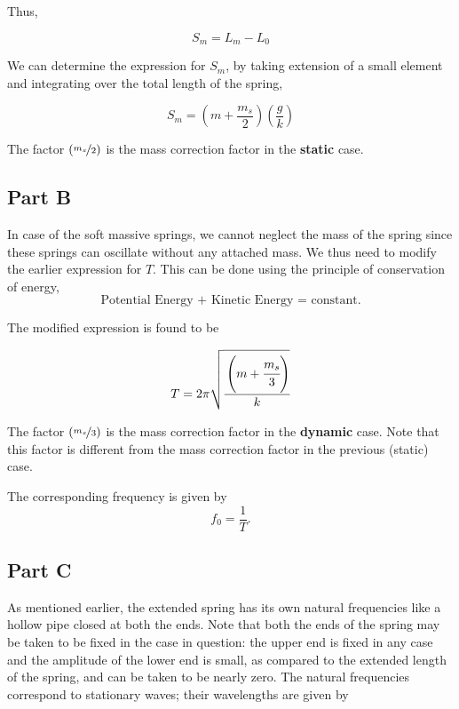 Thus,

\begin{equation}
S_m = L_m - L_0
\end{equation}

We can determine the expression for $S_m$, by taking extension of a small element and integrating over the total length of the spring,

\begin{equation}
S_m = \left( m + \frac{m_s}{2} \right)\left(\frac{g}{k} \right)
\end{equation}

The factor $(\nicefrac{m_s}{2})$ is the mass correction factor in the \textbf{static} case.


\subsection*{Part B}
In case of the soft massive springs, we cannot neglect the mass of the spring since these springs can oscillate without any attached mass. We thus need to modify the earlier expression for $T$. This can be done using the principle of conservation of energy, $$\text{Potential Energy + Kinetic Energy = constant.}$$

The modified expression is found to be

\begin{equation}
T = 2\pi \sqrt{\cfrac{\left(m + \cfrac{m_s}{3}\right)}{k}}
\end{equation}

The factor $(\nicefrac{m_s}{3})$ is the mass correction factor in the \textbf{dynamic} case. Note that this factor is different from the mass correction factor in the previous (static) case.

The corresponding frequency is given by $$f_0 = \frac{1}{T}.$$


\subsection*{Part C}

As mentioned earlier, the extended spring has its own natural frequencies like a hollow pipe closed at both the ends. Note that both the ends of the spring may be taken to be fixed in the case in question: the upper end is fixed in any case and the amplitude of the lower end is small, as compared to the extended length of the spring, and can be taken to be nearly zero. The natural frequencies correspond to stationary waves; their wavelengths are given by 

